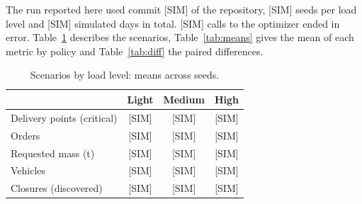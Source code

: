 \documentclass[11pt]{article}
\newcommand{\pend}[1]{\textcolor{red!60!black}{#1}}
\begin{document}
The run reported here used commit \pend{[SIM]} of the repository, \pend{[SIM]} seeds per load level and \pend{[SIM]} simulated days in total. \pend{[SIM]} calls to the optimizer ended in error. Table~\ref{tab:scen} describes the scenarios, Table~\ref{tab:means} gives the mean of each metric by policy and Table~\ref{tab:diff} the paired differences.

\begin{table}[ht]
\centering
\small
\caption{Scenarios by load level: means across seeds.}
\label{tab:scen}
\begin{tabular}{lccc}
\toprule
 & Light & Medium & High \\
\midrule
Delivery points (critical) & [SIM] & [SIM] & [SIM] \\
Orders & [SIM] & [SIM] & [SIM] \\
Requested mass (t) & [SIM] & [SIM] & [SIM] \\
Vehicles & [SIM] & [SIM] & [SIM] \\
Closures (discovered) & [SIM] & [SIM] & [SIM] \\
\bottomrule
\end{tabular}
\end{table}
\end{document}
